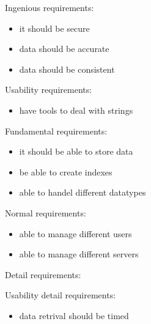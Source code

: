 \begin{elenco}
\item Ingenious requirements:
\begin{itemize}
    \item it should be secure
    \item data should be accurate
    \item data should be consistent
\end{itemize}
\item Usability requirements: \\
\begin{itemize}
    \item have tools to deal with strings
\end{itemize}
\item Fundamental requirements:
\begin{itemize}
    \item it should be able to store data
    \item be able to create indexes
    \item able to handel different datatypes
\end{itemize}
\item Normal requirements:
\begin{itemize}
    \item able to manage different users
    \item able to manage different servers
\end{itemize}
    \item Detail requirements:
    \item Usability detail requirements:
\begin{itemize}
    \item data retrival should be timed
\end{itemize}
\end{elenco}  
  
